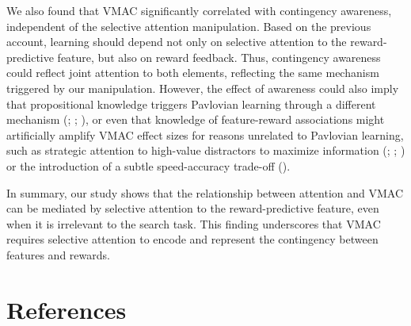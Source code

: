 \documentclass[
  jou,
  floatsintext,
  longtable,
  nolmodern,
  notxfonts,
  notimes,
  colorlinks=true,linkcolor=blue,citecolor=blue,urlcolor=blue]{apa7}
\begin{document}
We also found that VMAC significantly correlated with contingency
awareness, independent of the selective attention manipulation. Based on
the previous account, learning should depend not only on selective
attention to the reward-predictive feature, but also on reward feedback.
Thus, contingency awareness could reflect joint attention to both
elements, reflecting the same mechanism triggered by our manipulation.
However, the effect of awareness could also imply that propositional
knowledge triggers Pavlovian learning through a different mechanism
(;
;
), or even that knowledge of
feature-reward associations might artificially amplify VMAC effect sizes
for reasons unrelated to Pavlovian learning, such as strategic attention
to high-value distractors to maximize information
(;
;
) or the introduction of a
subtle speed-accuracy trade-off
().

In summary, our study shows that the relationship between attention and
VMAC can be mediated by selective attention to the reward-predictive
feature, even when it is irrelevant to the search task. This finding
underscores that VMAC requires selective attention to encode and
represent the contingency between features and rewards.

\section{References}\label{references}
\end{document}
